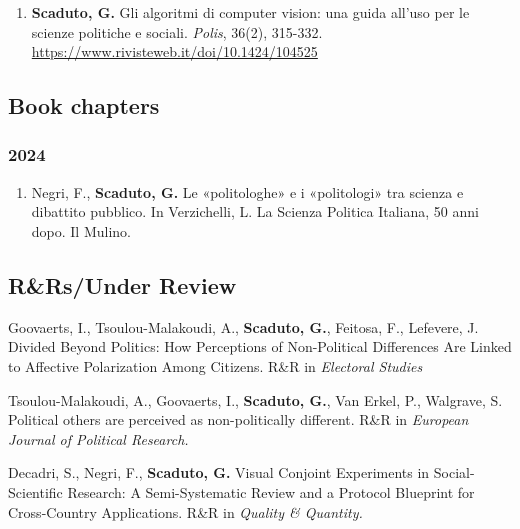 \documentclass[10pt,]{article}
\providecommand{\tightlist}{%
  \setlength{\itemsep}{0pt}\setlength{\parskip}{0pt}}
\renewenvironment{itemize}{
  \begin{list}{}{
    \setlength{\leftmargin}{1.5em}
  }
}{
  \end{list}
}
\begin{document}
\begin{enumerate}
\def\labelenumi{\arabic{enumi}.}
\tightlist
\item
  \textbf{Scaduto, G.} Gli algoritmi di computer vision: una guida
  all'uso per le scienze politiche e sociali. \emph{Polis}, 36(2),
  315-332. \url{https://www.rivisteweb.it/doi/10.1424/104525}
\end{enumerate}

\subsection{Book chapters}\label{book-chapters}

\subsubsection{2024}\label{section-4}

\begin{enumerate}
\def\labelenumi{\arabic{enumi}.}
\tightlist
\item
  Negri, F., \textbf{Scaduto, G.} Le «politologhe» e i «politologi» tra
  scienza e dibattito pubblico. In Verzichelli, L. La Scienza Politica
  Italiana, 50 anni dopo. Il Mulino.
\end{enumerate}

\subsection{R\&Rs/Under Review}\label{rrsunder-review}

\begin{itemize}
\tightlist
\item
  Goovaerts, I., Tsoulou-Malakoudi, A., \textbf{Scaduto, G.}, Feitosa,
  F., Lefevere, J. Divided Beyond Politics: How Perceptions of
  Non-Political Differences Are Linked to Affective Polarization Among
  Citizens. R\&R in \emph{Electoral Studies}
\end{itemize}

\begin{itemize}
\tightlist
\item
  Tsoulou-Malakoudi, A., Goovaerts, I., \textbf{Scaduto, G.}, Van Erkel,
  P., Walgrave, S. Political others are perceived as non-politically
  different. R\&R in \emph{European Journal of Political Research.}
\end{itemize}

\begin{itemize}
\tightlist
\item
  Decadri, S., Negri, F., \textbf{Scaduto, G.} Visual Conjoint
  Experiments in Social-Scientific Research: A Semi-Systematic Review
  and a Protocol Blueprint for Cross-Country Applications. R\&R in
  \emph{Quality \& Quantity.}
\end{itemize}
\end{document}

